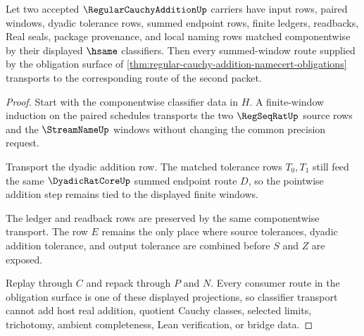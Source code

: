 \begin{theorem}
\label{thm:regular-cauchy-addition-window-sum-stability}
Let two accepted $\RegularCauchyAdditionUp$ carriers have input rows, paired windows, dyadic tolerance rows, summed endpoint rows, finite ledgers, readbacks, Real seals, package provenance, and local naming rows matched componentwise by their displayed $\hsame$ classifiers. Then every summed-window route supplied by the obligation surface of \autoref{thm:regular-cauchy-addition-namecert-obligations} transports to the corresponding route of the second packet.
\end{theorem}
\begin{proof}
Start with the componentwise classifier data in $H$. A finite-window induction on the paired schedules transports the two $\RegSeqRatUp$ source rows and the $\StreamNameUp$ windows without changing the common precision request.

Transport the dyadic addition row. The matched tolerance rows $T_0,T_1$ still feed the same $\DyadicRatCoreUp$ summed endpoint route $D$, so the pointwise addition step remains tied to the displayed finite windows.

The ledger and readback rows are preserved by the same componentwise transport. The row $E$ remains the only place where source tolerances, dyadic addition tolerance, and output tolerance are combined before $S$ and $Z$ are exposed.

Replay through $C$ and repack through $P$ and $N$. Every consumer route in the obligation surface is one of these displayed projections, so classifier transport cannot add host real addition, quotient Cauchy classes, selected limits, trichotomy, ambient completeness, Lean verification, or bridge data.
\end{proof}

